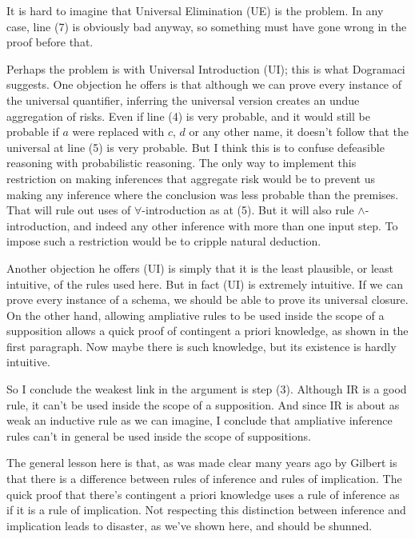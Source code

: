 It is hard to imagine that Universal Elimination (UE) is the problem. In any case, line (7) is obviously bad anyway, so something must have gone wrong in the proof before that.

Perhaps the problem is with Universal Introduction (UI); this is what Dogramaci suggests. One objection he offers is that although we can prove every instance of the universal quantifier, inferring the universal version creates an undue aggregation of risks. Even if line (4) is very probable, and it would still be probable if $a$ were replaced with $c$, $d$ or any other name, it doesn't follow that the universal at line (5) is very probable. But I think this is to confuse defeasible reasoning with probabilistic reasoning. The only way to implement this restriction on making inferences that aggregate risk would be to prevent us making any inference where the conclusion was less probable than the premises. That will rule out uses of $\forall$-introduction as at (5). But it will also rule $\wedge$-introduction, and indeed any other inference with more than one input step. To impose such a restriction would be to cripple natural deduction. 

Another objection he offers (UI) is simply that it is the least plausible, or least intuitive, of the rules used here. But in fact (UI) is extremely intuitive. If we can prove every instance of a schema, we should be able to prove its universal closure. On the other hand, allowing ampliative rules to be used inside the scope of a supposition allows a quick proof of contingent a priori knowledge, as shown in the first paragraph. Now maybe there is such knowledge, but its existence is hardly intuitive.

So I conclude the weakest link in the argument is step (3). Although IR is a good rule, it can't be used inside the scope of a supposition. And since IR is about as weak an inductive rule as we can imagine, I conclude that ampliative inference rules can't in general be used inside the scope of suppositions.

The general lesson here is that, as was made clear many years ago by Gilbert \citet{Harman1986} is that there is a difference between rules of inference and rules of implication. The quick proof that there's contingent a priori knowledge uses a rule of inference as if it is a rule of implication. Not respecting this distinction between inference and implication leads to disaster, as we've shown here, and should be shunned. 